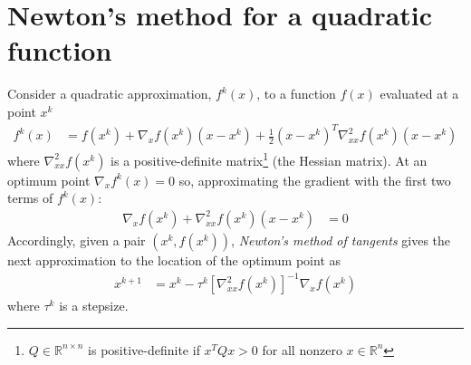 \documentclass[a4paper,twoside,10pt,english]{report}
\begin{document}
\section{\label{app:Newtons-method-quadratic-function}Newton's method for a quadratic function}
Consider a quadratic approximation, $f^{k}\left(x\right)$, to a function
$f\left(x\right)$ evaluated at a point $x^{k}$ 
\begin{align*}
f^{k}\left(x\right) &= f\left(x^{k}\right)+
\nabla_{x}f\left(x^{k}\right)\left(x-x^{k}\right)+
\frac{1}{2}\left(x-x^{k}\right)^{T}\nabla_{xx}^{2}f\left(x^{k}\right)\left(x-x^{k}\right)
\end{align*}
where $\nabla_{xx}^{2}f$$\left(x^{k}\right)$ is a positive-definite
matrix\footnote{$Q \in \mathbb{R}^{n\times n}$ is positive-definite if 
$x^{T}Qx>0$ for all nonzero $x \in \mathbb{R}^{n}$}
(the Hessian matrix). At an optimum point $\nabla_{x}f^{k}\left(x\right)=0$ so,
approximating the gradient with the first two terms of $f^{k}\left(x\right)$:
\begin{align*}
\nabla_{x}f\left(x^{k}\right)+
\nabla_{xx}^{2}f\left(x^{k}\right)\left(x-x^{k}\right) &= 0
\end{align*}
Accordingly, given a pair $\left(x^{k},f\left(x^{k}\right)\right)$, 
\emph{Newton's method of tangents} gives the next approximation to the location
of the optimum point as
\begin{align*}
x^{k+1} &= x^{k}-\tau^{k}\left[\nabla_{xx}^{2}f\left(x^{k}\right)\right]^{-1}\nabla_{x}f\left(x^{k}\right)
\end{align*}
where $\tau^{k}$ is a stepsize.
\end{document}
